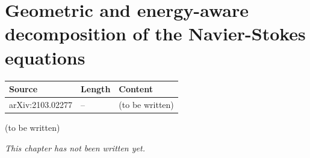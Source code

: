 \chapter{Geometric and energy-aware decomposition of the Navier-Stokes equations}\label{ch:c26}
\begin{paracol}{2}

\begin{sources}
\begin{tabularx}{\linewidth}{@{}l l L@{}}
\toprule
\textbf{Source} & \textbf{Length} & \textbf{Content}\\
\midrule
arXiv:2103.02277 & -- & (to be written)\\
\bottomrule
\end{tabularx}

\end{sources}

\begin{reading}
(to be written)
\end{reading}

\emph{This chapter has not been written yet.}

\flushside
\end{paracol}
